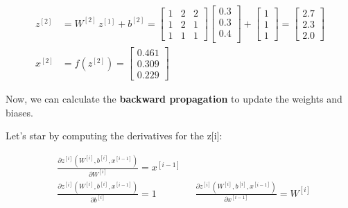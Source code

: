 \documentclass[12pt]{article}
\begin{document}
\begin{enumerate}
\begin{equation*}
    \begin{aligned}
        z^{[2]} &= W^{[2]} \, z^{[1]} + b^{[2]} = \begin{bmatrix}
            1 & 2 & 2 \\
            1 & 2 & 1 \\
            1 & 1 & 1
        \end{bmatrix} \begin{bmatrix}
            0.3 \\  
            0.3 \\
            0.4 \\
        \end{bmatrix} + \begin{bmatrix}
            1 \\
            1 \\
            1
        \end{bmatrix} = \begin{bmatrix}
            2.7 \\
            2.3 \\
            2.0
        \end{bmatrix} \\
        x^{[2]} &= f\left(z^{[2]}\right) = \begin{bmatrix}
            0.461 \\
            0.309 \\
            0.229
        \end{bmatrix}
    \end{aligned}
\end{equation*}

\vspace{10pt}
Now, we can calculate the \textbf{backward propagation} to update the weights and biases.

\vspace{10pt}
Let's star by computing the derivatives for the z[i]:
    
    \begin{equation*}
        \begin{aligned}
            &\frac{\partial z^{[i]}(W^{[i]}, b^{[i]}, x^{[i-1]})}{\partial W^{[i]}} = x^{[i-1]}\\
            &\frac{\partial z^{[i]}(W^{[i]}, b^{[i]}, x^{[i-1]})}{\partial b^{[i]}} = 1 \qquad \quad \quad \frac{\partial z^{[i]}(W^{[i]}, b^{[i]}, x^{[i-1]})}{\partial x^{[i-1]}} = W^{[i]}\\
        \end{aligned}
    \end{equation*}


\end{enumerate}
\end{document}
